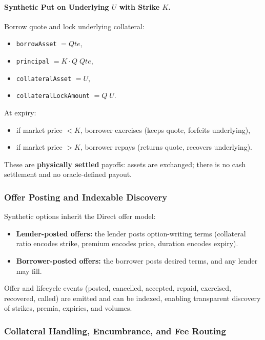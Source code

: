 \documentclass[version=preprint]{iacrcc}
\begin{document}
\paragraph{Synthetic Put on Underlying $U$ with Strike $K$.}
Borrow quote and lock underlying collateral:
\begin{itemize}
  \item \texttt{borrowAsset} $= Qte$,
  \item \texttt{principal} $= K \cdot Q\;Qte$,
  \item \texttt{collateralAsset} $= U$,
  \item \texttt{collateralLockAmount} $= Q\;U$.
\end{itemize}

At expiry:
\begin{itemize}
  \item if market price $< K$, borrower exercises (keeps quote, forfeits underlying),
  \item if market price $> K$, borrower repays (returns quote, recovers underlying).
\end{itemize}

These are \textbf{physically settled} payoffs: assets are exchanged; there is no cash settlement and no oracle-defined payout.

\subsubsection{Offer Posting and Indexable Discovery}

Synthetic options inherit the Direct offer model:
\begin{itemize}
  \item \textbf{Lender-posted offers:} the lender posts option-writing terms (collateral ratio encodes strike, premium encodes price, duration encodes expiry).
  \item \textbf{Borrower-posted offers:} the borrower posts desired terms, and any lender may fill.
\end{itemize}

Offer and lifecycle events (posted, cancelled, accepted, repaid, exercised, recovered, called) are emitted and can be indexed, enabling transparent discovery of strikes, premia, expiries, and volumes.

\subsubsection{Collateral Handling, Encumbrance, and Fee Routing}
\end{document}
